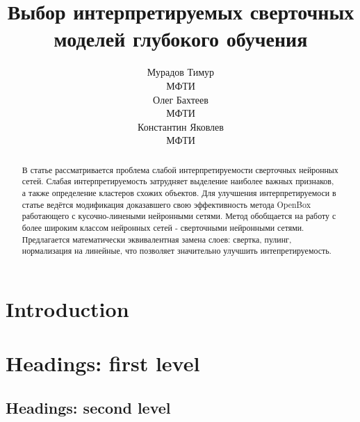 \documentclass{article}
\title{Выбор интерпретируемых сверточных моделей глубокого обучения}
\author{ Мурадов Тимур\\
	МФТИ\\
	\And
	Олег Бахтеев \\
	МФТИ\\
	\And
	Константин Яковлев \\
	МФТИ\\
}
\date{}
\begin{document}
\maketitle

\begin{abstract}
	В статье рассматривается проблема слабой интерпретируемости сверточных нейронных сетей. Слабая интерпретируемость затрудняет выделение наиболее важных признаков, а также определение кластеров схожих объектов. Для улучшения интерпретируемоси в статье ведётся модификация доказавшего свою эффективность метода OpenBox работающего с  кусочно-линеными нейронными сетями. Метод обобщается на работу с более широким классом нейронных сетей - сверточными нейронными сетями. Предлагается математически эквивалентная замена слоев: свертка, пулинг, нормализация на линейные, что позволяет значительно улучшить интепретируемость.
\end{abstract}



\section{Introduction}

\section{Headings: first level}
\label{sec:headings}


\subsection{Headings: second level}


\end{document}
